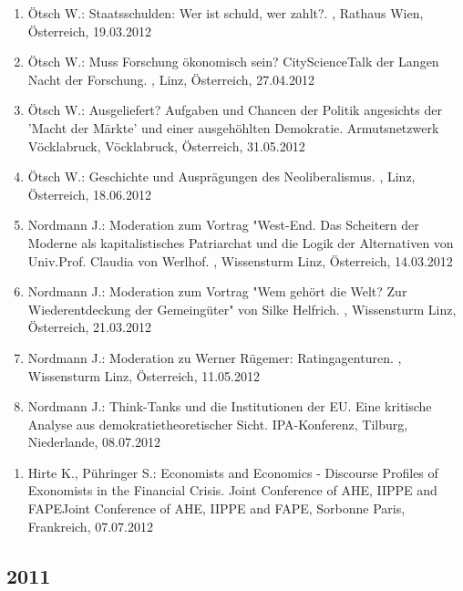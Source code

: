 \begin{enumerate}
	\item Ötsch W.: Staatsschulden: Wer ist schuld, wer zahlt?. , Rathaus Wien, Österreich, 19.03.2012
	\item Ötsch W.: Muss Forschung ökonomisch sein? CityScienceTalk der Langen Nacht der Forschung. , Linz, Österreich, 27.04.2012
	\item Ötsch W.: Ausgeliefert? Aufgaben und Chancen der Politik angesichts der 'Macht der Märkte' und einer ausgehöhlten Demokratie. Armutsnetzwerk Vöcklabruck, Vöcklabruck, Österreich, 31.05.2012
	\item Ötsch W.: Geschichte und Ausprägungen des Neoliberalismus. , Linz, Österreich, 18.06.2012
	\item Nordmann J.: Moderation zum Vortrag "West-End. Das Scheitern der Moderne als kapitalistisches Patriarchat und die Logik der Alternativen von Univ.Prof. Claudia von Werlhof. , Wissensturm Linz, Österreich, 14.03.2012
	\item Nordmann J.: Moderation zum Vortrag "Wem gehört die Welt? Zur Wiederentdeckung der Gemeingüter" von Silke Helfrich. , Wissensturm Linz, Österreich, 21.03.2012
	\item Nordmann J.: Moderation zu Werner Rügemer: Ratingagenturen. , Wissensturm Linz, Österreich, 11.05.2012
	\item Nordmann J.: Think-Tanks und die Institutionen der EU. Eine kritische Analyse aus demokratietheoretischer Sicht. IPA-Konferenz, Tilburg, Niederlande, 08.07.2012
\end{enumerate}

\begin{enumerate}
	\item Hirte K., Pühringer S.: Economists and Economics - Discourse Profiles of Exonomists in the Financial Crisis. Joint Conference of AHE, IIPPE and FAPEJoint Conference of AHE, IIPPE and FAPE, Sorbonne Paris, Frankreich, 07.07.2012
\end{enumerate}
\subsection*{2011}

